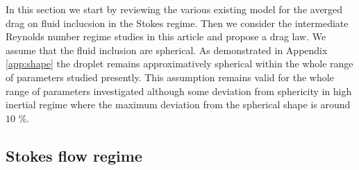 








In this section we start by reviewing the various existing model for the averged drag on fluid inclucsion in the Stokes regime. Then we consider the intermediate Reynolds number regime studies in this article and propose a drag law. We assume that the fluid inclusion are spherical. As demonstrated in Appendix \ref{app:shape} the droplet remains approximatively spherical within the whole range of parameters studied presently. This assumption remains valid for the whole range of parameters investigated although some deviation from sphericity in high inertial regime where the maximum deviation from the spherical shape is around $10$ \%.


\subsection{Stokes flow regime}

